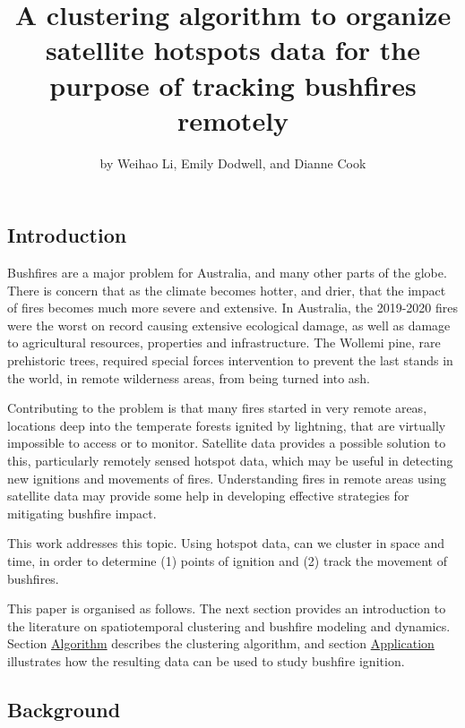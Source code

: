 \title{A clustering algorithm to organize satellite hotspots data for the
purpose of tracking bushfires remotely}
\author{by Weihao Li, Emily Dodwell, and Dianne Cook}

\maketitle


\hypertarget{introduction}{%
\subsection{Introduction}\label{introduction}}

Bushfires are a major problem for Australia, and many other parts of the
globe. There is concern that as the climate becomes hotter, and drier,
that the impact of fires becomes much more severe and extensive. In
Australia, the 2019-2020 fires were the worst on record causing
extensive ecological damage, as well as damage to agricultural
resources, properties and infrastructure. The Wollemi pine, rare
prehistoric trees, required special forces intervention to prevent the
last stands in the world, in remote wilderness areas, from being turned
into ash.

Contributing to the problem is that many fires started in very remote
areas, locations deep into the temperate forests ignited by lightning,
that are virtually impossible to access or to monitor. Satellite data
provides a possible solution to this, particularly remotely sensed
hotspot data, which may be useful in detecting new ignitions and
movements of fires. Understanding fires in remote areas using satellite
data may provide some help in developing effective strategies for
mitigating bushfire impact.

This work addresses this topic. Using hotspot data, can we cluster in
space and time, in order to determine (1) points of ignition and (2)
track the movement of bushfires.

This paper is organised as follows. The next section provides an
introduction to the literature on spatiotemporal clustering and bushfire
modeling and dynamics. Section \protect\hyperlink{algorithm}{Algorithm}
describes the clustering algorithm, and section
\protect\hyperlink{application}{Application} illustrates how the
resulting data can be used to study bushfire ignition.

\hypertarget{background}{%
\subsection{Background}\label{background}}

